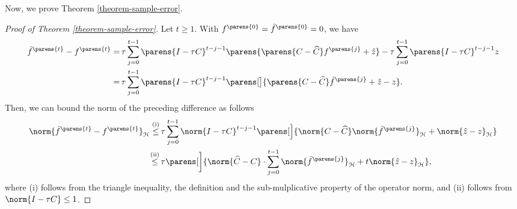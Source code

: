 Now, we prove Theorem \ref{theorem-sample-error}. 

\begin{proof}[Proof of Theorem \ref{theorem-sample-error}]
	Let $t \ge 1$. With $f^{\parens{0}} = \hat{f}^{\parens{0}} = 0$, we have 
	\begin{align*}
		\hat{f}^{\parens{t}} - f^{\parens{t}} = & \, \tau \sum_{j=0}^{t-1} \parens{I - \tau C}^{t-j-1} \parens{\parens{C - \widehat{C}} f^{\parens{j}} + \hat{z}} - \tau \sum_{j=0}^{t-1} \parens{I - \tau C}^{t-j-1} z \nonumber \\ 
		= & \, \tau \sum_{j=0}^{t-1} \parens{I - \tau C}^{t-j-1} \parens[\big]{\parens{C - \widehat{C}} \hat{f}^{\parens{j}} + \hat{z} - z}. 
	\end{align*}
	Then, we can bound the norm of the preceding difference as follows 
	\begin{align*}
		\norm{\hat{f}^{\parens{t}} - f^{\parens{t}}}_{\hil} \stackrel{\text{(i)}}{\le} & \, \tau \sum_{j=0}^{t-1} \norm{I - \tau C}^{t-j-1} \parens[\Big]{\norm{C - \widehat{C}} \norm{\hat{f}^{\parens{j}}}_{\calH} + \norm{\hat{z} - z}_{\hil}} \\
		\stackrel{\text{(ii)}}{\le} & \, \tau \parens[\bigg]{\norm{\widehat{C} - C} \cdot \sum_{j=0}^{t-1} \norm{\hat{f}^{\parens{j}}}_{\hil} + t \norm{\hat{z} - z}_{\hil}}, 
	\end{align*}
	where (i) follows from the triangle inequality, the definition and the sub-mulplicative property of the operator norm, and (ii) follows from $\norm{I - \tau C} \le 1$. 
	

\end{proof}
